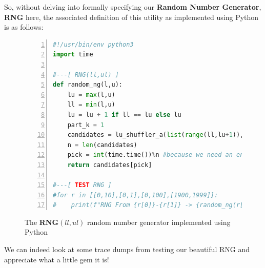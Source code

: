 \documentclass[a4paper, 18pt]{book} %
\begin{document}
So, without delving into formally specifying our \textbf{Random Number Generator}, \textbf{RNG} here, the associated definition of this utility as implemented using Python is as follows:

\begin{figure}[H]
  \begin{center}
  \begin{lstlisting}[caption={The RNG}, label={LST_RNG}, language=Python, frame=single, numbers=left, basicstyle=\ttfamily,  commentstyle=\color{blue}]
#!/usr/bin/env python3
import time

#---[ RNG(ll,ul) ]
def random_ng(l,u):
    lu = max(l,u)
    ll = min(l,u)
    lu = lu + 1 if ll == lu else lu
    part_k = 1
    candidates = lu_shuffler_a(list(range(ll,lu+1)),part_k)[0]
    n = len(candidates)
    pick = int(time.time())%n #because we need an entropy source!
    return candidates[pick]

#---[ TEST RNG ]
#for r in [[0,10],[0,1],[0,100],[1900,1999]]:
#    print(f"RNG From {r[0]}-{r[1]} -> {random_ng(r[0],r[1])}")
\end{lstlisting}
  \end{center}
  \caption{The \textbf{RNG}$(ll,ul)$ random number generator implemented using Python}
\end{figure}


We can indeed look at some trace dumps from testing our beautiful RNG and appreciate what a little gem it is!
\end{document}
